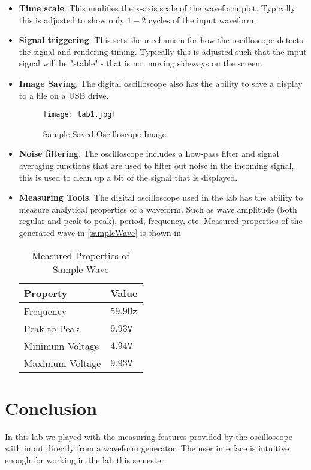 \documentclass[main.tex]{subfile}
\begin{document}
\begin{itemize}
	\item \textbf{Time scale}. This modifies the x-axis scale of the waveform
		plot. Typically this is adjusted to show only $1-2$ cycles of the input waveform.
	\item \textbf{Signal triggering}. This sets the mechanism for how the
		oscilloscope detects the signal and rendering timing. Typically this is
		adjusted such that the input signal will be "stable" - that is not moving
		sideways on the screen.
	\item \textbf{Image Saving}. The digital oscilloscope also has the ability
		to save a display to a file on a USB drive.

		\begin{figure}[!t]
			\centering
			\texttt{[image: lab1.jpg]}
			\caption{Sample Saved Oscilloscope Image}
			\label{fig:sampleImage}
		\end{figure}

	\item \textbf{Noise filtering}. The oscilloscope includes a Low-pass filter
		and signal averaging functions that are used to filter out noise in the
		incoming signal, this is used to clean up a bit of the signal that is
		displayed.
	\item \textbf{Measuring Tools}. The digital oscilloscope used in the lab has
		the ability to measure analytical properties of a waveform. Such as wave
		amplitude (both regular and peak-to-peak), period, frequency, etc. Measured
		properties of the generated wave in \eqref{sampleWave} is shown in

		\begin{table}[H]
			\begin{center}
				\caption{Measured Properties of Sample Wave}
				\label{tab:measuredProp}
				\begin{tabular}{ll}
					\\ \toprule
					Property & Value 
					\\ \midrule
					Frequency & $59.9\texttt{Hz}$
					\\Peak-to-Peak & $9.93\texttt{V}$
					\\Minimum Voltage & $4.94\texttt{V}$
					\\Maximum Voltage & $9.93\texttt{V}$
					\\ \bottomrule
				\end{tabular}
			\end{center}
		\end{table}

\end{itemize}


\section{Conclusion} 
\label{sec:conclusion}

In this lab we played with the measuring features provided by the oscilloscope
with input directly from a waveform generator. The user interface is intuitive
enough for working in the lab this semester.
\end{document}
